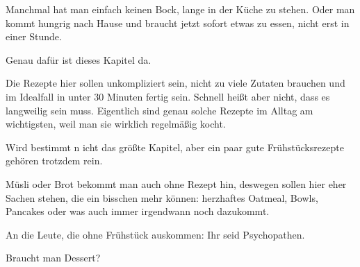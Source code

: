 \documentclass[
  a4paper,
  twoside,
  11pt
]{article}
\begin{document}


Manchmal hat man einfach keinen Bock, lange in der Küche zu stehen. Oder man kommt hungrig nach Hause und braucht jetzt sofort etwas zu essen, nicht erst in einer Stunde.

Genau dafür ist dieses Kapitel da.

Die Rezepte hier sollen unkompliziert sein, nicht zu viele Zutaten brauchen und im Idealfall in unter 30 Minuten fertig sein. Schnell heißt aber nicht, dass es langweilig sein muss. Eigentlich sind genau solche Rezepte im Alltag am wichtigsten, weil man sie wirklich regelmäßig kocht.

\mylocaltableofcontents%
\newpage











Wird bestimmt n
icht das größte Kapitel, aber ein paar gute Frühstücksrezepte gehören trotzdem rein.

Müsli oder Brot bekommt man auch ohne Rezept hin, deswegen sollen hier eher Sachen stehen, die ein bisschen mehr können: herzhaftes Oatmeal, Bowls, Pancakes oder was auch immer irgendwann noch dazukommt.

An die Leute, die ohne Frühstück auskommen: Ihr seid Psychopathen.

\mylocaltableofcontents%
\newpage






Braucht man Dessert?
\end{document}
